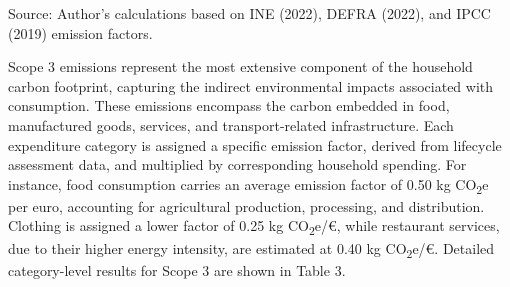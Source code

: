 \documentclass[12pt,a4paper]{article}%
\begin{document}
\begin{table}[h]
\centering
\captionsetup{justification=raggedright,singlelinecheck=false} 
\caption{\small Indirect Emissions from Heating and Cooling (Scope 2)}\label{tab:scope2}
\raggedright

\vspace{0.3cm}
\footnotesize{Source: Author's calculations based on INE (2022), DEFRA (2022), and IPCC (2019) emission factors.}
\end{table}

Scope 3 emissions represent the most extensive component of the household carbon footprint, capturing the indirect environmental impacts associated with consumption. These emissions encompass the carbon embedded in food, manufactured goods, services, and transport-related infrastructure. Each expenditure category is assigned a specific emission factor, derived from lifecycle assessment data, and multiplied by corresponding household spending. For instance, food consumption carries an average emission factor of 0.50 kg CO\textsubscript{2}e per euro, accounting for agricultural production, processing, and distribution. Clothing is assigned a lower factor of 0.25 kg CO\textsubscript{2}e/€, while restaurant services, due to their higher energy intensity, are estimated at 0.40 kg CO\textsubscript{2}e/€. Detailed category-level results for Scope 3 are shown in Table 3.
\end{document}
